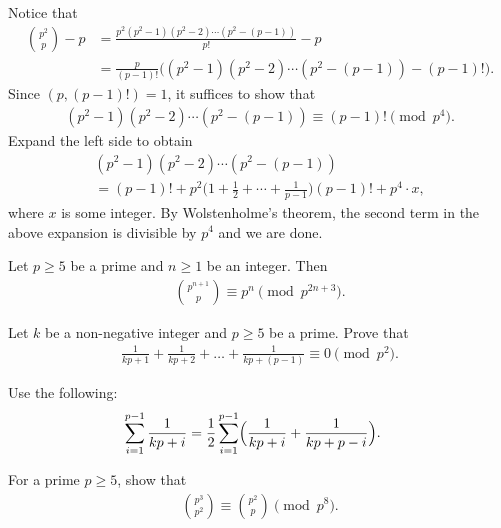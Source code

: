\documentclass[12pt]{subfile}
\begin{document}
		\begin{solution}
			Notice that
				\begin{align*}
					\binom{p^2}{p} - p &=\frac{p^2(p^2-1)(p^2-2)\cdots(p^2-(p-1))}{p!}-p\\
					&=\frac{p}{(p-1)!} \Big((p^2-1)(p^2-2)\cdots(p^2-(p-1)) - (p-1)!\Big).
				\end{align*}
			Since $(p, (p-1)!)=1$, it suffices to show that
				\begin{align*}
					(p^2-1)(p^2-2)\cdots(p^2-(p-1)) \equiv (p-1)! \pmod{p^4}.
				\end{align*}
			Expand the left side to obtain
				\begin{multline*}
					(p^2-1)(p^2-2)\cdots(p^2-(p-1)) \\ = (p-1)! + p^2\Big(1+\frac{1}{2}+\cdots+\frac{1}{p-1}\Big)\left(p-1\right)!+p^4\cdot x,
				\end{multline*}
			where $x$ is some integer. By Wolstenholme's theorem, the second term in the above expansion is divisible by $p^4$ and we are done.
		\end{solution}
		
		\begin{corollary}
			Let $p \geq 5$ be a prime and $n\geq 1$ be an integer. Then
				\begin{align*}
					\binom{p^{n+1}}{p} \equiv p^n \pmod{p^{2n+3}}.
				\end{align*}
		\end{corollary}
		
		\begin{problem}
			Let $k$ be a non-negative integer and $p\geq 5$ be a prime. Prove that
				\begin{align*}
					\frac{1}{kp+1}+ \frac{1}{kp+2}+ \dots+\frac{1}{kp+(p-1)}\equiv 0\pmod{p^2}.
				\end{align*}
		\end{problem}
		
		\begin{hint}
			Use the following:
				\begin{align*}
					\sum_{i=1}^{p-1}\frac{1}{kp+i} &=\frac{1}{2}\sum_{i=1}^{p-1}\Bigl(\frac{1}{kp+i}+\frac{1}{kp+p-i}\Bigr).
				\end{align*}
		\end{hint}
	
		\begin{problem}
			For a prime $p \geq 5$, show that
				\begin{align*}
					\binom{p^3}{p^2} \equiv \binom{p^2}{p} \pmod{p^8}.
				\end{align*}
		\end{problem}
		
\end{document}
